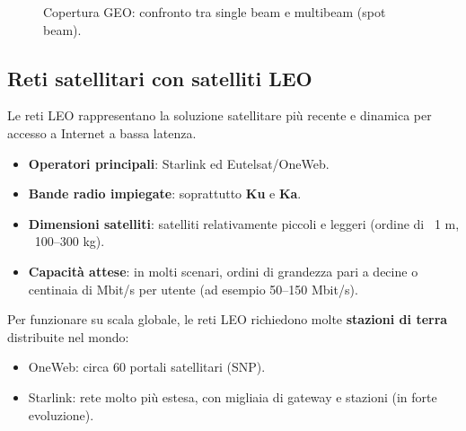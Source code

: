 \begin{figure}[H]
\centering
{}
\caption{Copertura GEO: confronto tra single beam e multibeam (spot beam).}
\end{figure}

\subsection{Reti satellitari con satelliti LEO}
Le reti LEO rappresentano la soluzione satellitare più recente e dinamica per accesso a Internet a bassa latenza.

\begin{itemize}
	\item \textbf{Operatori principali}: Starlink ed Eutelsat/OneWeb.
	\item \textbf{Bande radio impiegate}: soprattutto \textbf{Ku} e \textbf{Ka}.
	\item \textbf{Dimensioni satelliti}: satelliti relativamente piccoli e leggeri (ordine di ~1 m, ~100--300 kg).
	\item \textbf{Capacità attese}: in molti scenari, ordini di grandezza pari a decine o centinaia di Mbit/s per utente (ad esempio 50--150 Mbit/s).
\end{itemize}
\noindent
Per funzionare su scala globale, le reti LEO richiedono molte \textbf{stazioni di terra} distribuite nel mondo:
\begin{itemize}
	\item OneWeb: circa 60 portali satellitari (SNP).
	\item Starlink: rete molto più estesa, con migliaia di gateway e stazioni (in forte evoluzione).
\end{itemize}


